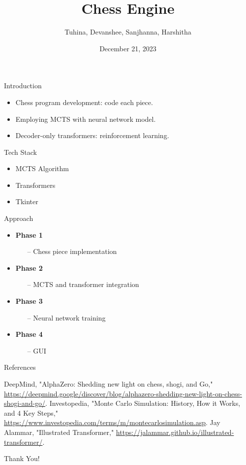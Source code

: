 \documentclass{beamer}
\title{Chess Engine}
\author{Tuhina, Devanshee, Sanjhanna, Harshitha}
\date{December 21, 2023}
\begin{document}
\frame{\titlepage}

\begin{frame}{Introduction}
    \begin{itemize}
        \item Chess program development: code each piece.
        \item Employing MCTS with neural network model.
        \item Decoder-only transformers: reinforcement learning.
    \end{itemize}
\end{frame}

\begin{frame}{Tech Stack}
    \begin{itemize}
        \item MCTS Algorithm
        \item Transformers
        \item Tkinter
    \end{itemize}
\end{frame}

\begin{frame}{Approach}
    \begin{itemize}
        \item \textbf{Phase 1}
        \begin{itemize}
            \item[--] Chess piece implementation
        \end{itemize}
        \item \textbf{Phase 2}
        \begin{itemize}
            \item[--] MCTS and transformer integration
        \end{itemize}
        \item \textbf{Phase 3}
        \begin{itemize}
            \item[--] Neural network training
        \end{itemize}
        \item \textbf{Phase 4}
        \begin{itemize}
            \item[--] GUI
        \end{itemize}
    \end{itemize}
\end{frame}

\begin{frame}{References}
    \begin{thebibliography}{1}
        DeepMind, "AlphaZero: Shedding new light on chess, shogi, and Go," \url{https://deepmind.google/discover/blog/alphazero-shedding-new-light-on-chess-shogi-and-go/}.
        Investopedia, "Monte Carlo Simulation: History, How it Works, and 4 Key Steps," \url{https://www.investopedia.com/terms/m/montecarlosimulation.asp}.
        Jay Alammar, "Illustrated Transformer," \url{https://jalammar.github.io/illustrated-transformer/}.
    \end{thebibliography}
\end{frame}

\begin{frame}
  \begin{center}
    \Huge
    Thank You!
  \end{center}
\end{frame}
\end{document}
